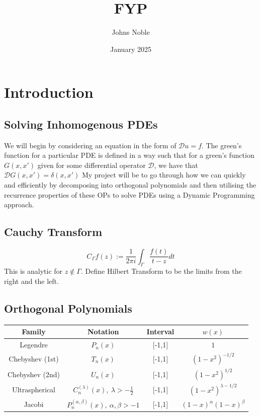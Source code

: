 \documentclass{article}
\title{FYP}
\author{Johns Noble}
\date{January 2025}
\begin{document}
\maketitle

\newpage
\tableofcontents
\newpage

\section{Introduction}
\subsection{Solving Inhomogenous PDEs}
We will begin by considering an equation in the form of $\mathcal{D}u=f$.
The green's function for a particular PDE is defined in a way such that for a green's function $G(x,x')$ given for some differential operator $\mathcal{D}$, we have that $\mathcal{D}G(x,x') = \delta(x,x')$
My project will be to go through how we can quickly and efficiently by decomposing into orthogonal polynomials and then utilising the recurrence properties of these OPs to solve PDEs using a Dynamic Programming approach.
\subsection{Cauchy Transform}
\begin{equation} \label{cauchy transform}
C_\Gamma f(z):=\frac{1}{2\pi i}\int_\Gamma \frac{f(t)}{t-z}dt
\end{equation}
This is analytic for $z \not\in \Gamma$. Define Hilbert Transform to be the limits from the right and the left.
\subsection{Orthogonal Polynomials}
\begin{center}
\begin{tabular}{ |c|c|c|c| } 
 \hline
	Family & Notation & Interval & $w(x)$ \\ 
 \hline
	Legendre & $P_n(x)$ & [-1,1] & $1$ \\ 
	Chebyshev (1st) & $T_n(x)$ & [-1,1] & $(1-x^2)^{-1/2}$ \\ 
	Chebyshev (2nd) & $U_n(x)$ & [-1,1] & $(1-x^2)^{1/2}$ \\
	Ultraspherical & $C_n^{(\lambda)}(x),\:\lambda>-\frac{1}{2}$ & [-1,1] & $(1-x^2)^{\lambda-1/2}$ \\
	Jacobi & $P_n^{(\alpha,\beta)}(x),\:\alpha,\beta>-1$ & [-1,1] & $(1-x)^\alpha(1-x)^\beta$ \\
 \hline
\end{tabular}
\end{center}
\end{document}
